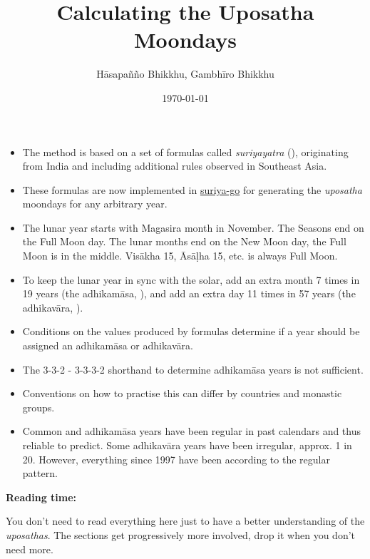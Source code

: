 \documentclass[11pt,oneside]{memoir-article}
\author{Hāsapañño Bhikkhu, Gambhīro Bhikkhu}
\date{\today}
\title{Calculating the Uposatha Moondays}
\begin{document}
\maketitle
\frontmatter

\begin{tldr}
\begin{itemize}
\item The method is based on a set of formulas called \emph{suriyayatra} (),
originating from India and including additional rules observed in Southeast
Asia.
\item These formulas are now implemented in \href{https://github.com/splendidmoons/suriya-go}{suriya-go} for generating the \emph{uposatha}
  moondays for any arbitrary year.
\item The lunar year starts with Magasira month in November. The Seasons end on the
Full Moon day. The lunar months end on the New Moon day, the Full Moon is in
the middle. Visākha 15, Āsāḷha 15, etc. is always Full Moon.
\item To keep the lunar year in sync with the solar, add an extra month 7 times in
19 years (the adhikamāsa, ), and add an extra day 11 times in 57
years (the adhikavāra, ).
\item Conditions on the values produced by formulas determine if a year should be
assigned an adhikamāsa or adhikavāra.
\item The 3-3-2 - 3-3-3-2 shorthand to determine adhikamāsa years is not sufficient.
\item Conventions on how to practise this can differ by countries and monastic groups.
\item Common and adhikamāsa years have been regular in past calendars and thus
reliable to predict. Some adhikavāra years have been irregular, approx. 1
in 20. However, everything since 1997 have been according to the regular
pattern.
\end{itemize}
\end{tldr}

\thispagestyle{empty}


{\centering\large\bfseries
Reading time:
\par}

You don't need to read everything here just to have a better understanding of
the \emph{uposathas}. The sections get progressively more involved, drop it when you
don't need more.
\end{document}
